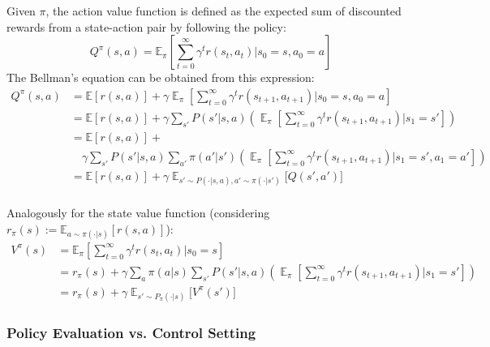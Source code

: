 \documentclass[12pt,a4paper,openright,twoside]{article}
\DeclareMathOperator*{\E}{\mathbb{E}}
\numberwithin{equation}{section}
\theoremstyle{definition}
\theoremstyle{remark}
\theoremstyle{plain}
\begin{document}
Given $\pi$, the action value function is defined as the expected sum of discounted rewards from a state-action pair by following the policy:
\begin{equation} \label{AV}
Q^\pi (s,a) = \mathbb{E}_\pi \left[ \sum_{t=0}^\infty \gamma^t r(s_t,a_t) \bigg| s_0=s, a_0=a \right] 
\end{equation}
The Bellman's equation can be obtained from this expression:
\begin{equation} \label{BE}
\begin{split}
    Q^\pi (s,a) &= \mathbb{E} \left[ r(s,a) \right] + \gamma \E_\pi \left[ \sum_{t=0}^\infty \gamma^t r(s_{t+1},a_{t+1}) \bigg| s_0=s, a_0=a \right] \\
    &= \mathbb{E} \left[ r(s,a) \right] + \gamma \sum_{s'} P(s'|s,a) \left( \E_\pi \left[ \sum_{t=0}^\infty \gamma^t r(s_{t+1},a_{t+1}) \bigg| s_1=s' \right] \right) \\
    &= \mathbb{E} \left[ r(s,a) \right] + \\
    & \quad \gamma \sum_{s'} P(s'|s,a) \sum_{a'} \pi(a'|s')\left( \E_\pi \left[ \sum_{t=0}^\infty \gamma^t r(s_{t+1},a_{t+1}) \bigg| s_1=s', a_1=a' \right] \right)\\
    &= \mathbb{E} \left[ r(s,a) \right] + \gamma \E_{s'\sim P(\cdot | s,a), a' \sim \pi(\cdot | s')} \bigg[Q(s',a') \bigg] \\
\end{split}
\end{equation}


Analogously for the state value function (considering $r_\pi(s) := \mathbb{E}_{a\sim\pi(\cdot | s)} \left[ r(s,a) \right]$):
\begin{equation} \label{SV}
\begin{split}
    V^\pi (s) &= \mathbb{E}_\pi \left[ \sum_{t=0}^\infty \gamma^t r(s_t,a_t) \bigg| s_0=s\right] \\
    &= r_\pi(s) + \gamma \sum_a \pi(a | s) \sum_{s'} P(s'|s,a) \left( \E_\pi \left[ \sum_{t=0}^\infty \gamma^t r(s_{t+1},a_{t+1}) \bigg| s_1=s' \right] \right) \\
    &= r_\pi(s) + \gamma \E_{s'\sim P_{\pi}(\cdot | s)} \bigg[V^\pi(s') \bigg]
\end{split}
\end{equation}


\subsubsection*{Policy Evaluation vs. Control Setting}
\end{document}
